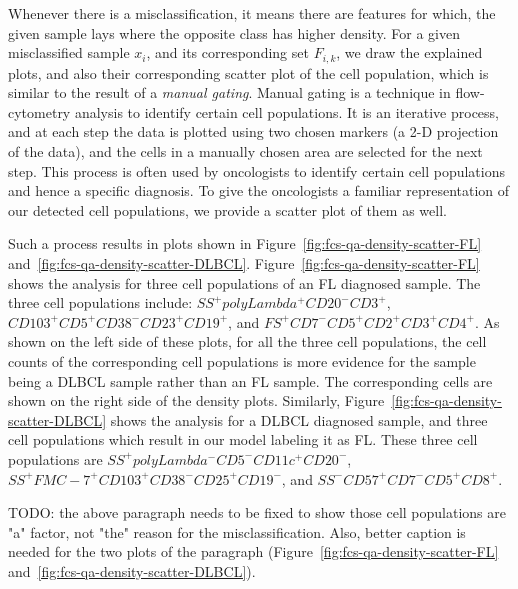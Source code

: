 Whenever there is a misclassification, it means there are features for which, the given sample lays where the opposite class has higher density. For a given misclassified sample $x_i$, and its corresponding set $F_{i,k}$, we draw the explained plots, and also their corresponding scatter plot of the cell population, which is similar to the result of a \emph{manual gating}. Manual gating is a technique in flow-cytometry analysis to identify certain cell populations. It is an iterative process, and at each step the data is plotted using two chosen markers (a 2-D projection of the data), and the cells in a manually chosen area are selected for the next step. This process is often used by oncologists to identify certain cell populations and hence a specific diagnosis. To give the oncologists a familiar representation of our detected cell populations, we provide a scatter plot of them as well.

Such a process results in plots shown in Figure~\ref{fig:fcs-qa-density-scatter-FL} and~\ref{fig:fcs-qa-density-scatter-DLBCL}. Figure~\ref{fig:fcs-qa-density-scatter-FL} shows the analysis for three cell populations of an FL diagnosed sample. The three cell populations include: $SS^+polyLambda^+CD20^−CD3^+$, $CD103^+CD5^+CD38^−CD23^+CD19^+$, and $FS^+CD7^−CD5^+CD2^+CD3^+CD4^+$. As shown on the left side of these plots, for all the three cell populations, the cell counts of the corresponding cell populations is more evidence for the sample being a DLBCL sample rather than an FL sample. The corresponding cells are shown on the right side of the density plots. Similarly, Figure~\ref{fig:fcs-qa-density-scatter-DLBCL} shows the analysis for a DLBCL diagnosed sample, and three cell populations which result in our model labeling it as FL. These three cell populations are $SS^+polyLambda^−CD5^−CD11c^+CD20^−$, $SS^+FMC−7^+CD103^+CD38^−CD25^+CD19^−$, and $SS^−CD57^+CD7^−CD5^+CD8^+$. 

TODO: the above paragraph needs to be fixed to show those cell populations are "a" factor, not "the" reason for the misclassification. Also, better caption is needed for the two plots of the paragraph (Figure~\ref{fig:fcs-qa-density-scatter-FL} and~\ref{fig:fcs-qa-density-scatter-DLBCL}).

